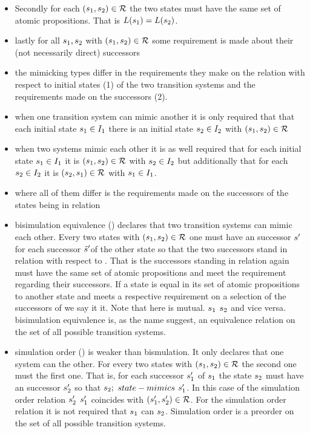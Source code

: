 \documentclass[preview]{standalone}
\begin{document}
\begin{itemize}
			\item Secondly for each $({s}_1, {s}_2) \in {\mathcal{R}}$ the two states must have the same set of atomic propositions. That is ${L}({s}_1) = {L}({s}_2)$.
			\item lastly for all ${s}_1, {s}_2$ with $({s}_1, {s}_2) \in {\mathcal{R}}$ some requirement is made about their (not necessarily direct) successors
			\item the mimicking types differ in the requirements they make on the relation \mimicrel with respect to initial states (1) of the two transition systems and the requirements made on the successors (2).
			\item when one transition system can mimic another it is only required that that each initial state ${s}_1 \in {I}_1$ there is an initial state ${s}_2 \in {I}_2$ with $({s}_1,{s}_2) \in {\mathcal{R}}$
			\item when two systems mimic each other it is as well required that for each initial state ${s}_1 \in {I}_1$ it is $({s}_1, {s}_2) \in {\mathcal{R}}$ with ${s}_2 \in {I}_2$ but additionally that for each ${s}_2 \in {I}_2$ it is $({s}_2, {s}_1) \in {\mathcal{R}}$ with ${s}_1 \in {I}_1$.
			\item where all of them differ is the requirements made on the successors of the states being in relation
			\item bisimulation equivalence (\bisimeq) declares that two transition systems can mimic each other. Every two states with $({s}_1, {s}_2) \in {\mathcal{R}}$ one must have an successor ${s}'$ for each successor ${\tilde{{s}}}'$of the other state so that the two successors stand in relation with respect to \mimicrel. That is the successors standing in relation again must have the same set of atomic propositions and meet the requirement regarding their successors. If a state \state is equal in its set of atomic propositions to another state \smstate and meets a respective requirement on a selection of the successors of \smstate we say it \stmimicsN it. Note that here \stmimickingN is mutual. ${s}_1$ \stmimicsN ${s}_2$ and vice versa.  bisimulation equivalence is, as the name suggest, an equivalence relation on the set of all possible transition systems.
			\item simulation order (\simorder) is weaker than bismulation. It only declares that one system can \stmimicN the other. For every two states with $({s}_1, {s}_2) \in {\mathcal{R}}$ the second one must \stmimicN the first one. That is, for each successor ${s}_1'$ of ${s}_1$ the state ${s}_2$ must have an successor ${s}_2'$ so that ${s}_2;$ $state-mimics$ ${s}_1'$. In this case of the simulation order relation ${s}_2'$ \stmimickingN ${s}_1'$ coincides with $({s}_1', {s}_2') \in {\mathcal{R}}$. For the simulation order relation it is not required that ${s}_1$ can \stmimicN ${s}_2$. Simulation order is a preorder on the set of all possible transition systems.

\end{itemize}
\end{document}
